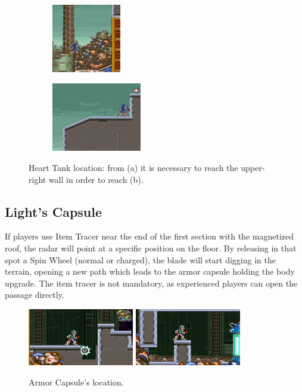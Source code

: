 \begin{figure}[htp]
	\centering
	\begin{subfigure}{0.3\linewidth}
		\centering
		\includegraphics[height=3cm]{figures/X2/Morph_moth/Moth_heart_1.jpg}	
		\caption{}
	\end{subfigure}
	\begin{subfigure}{0.4\linewidth}
		\centering
		\includegraphics[height=3cm]{figures/X2/Morph_moth/Moth_heart_2.jpg}
		\caption{}	
	\end{subfigure}
	\caption{Heart Tank location: from (a) it is necessary to reach the upper-right wall in order to reach (b).}
\end{figure}


\subsection{Light's Capsule}\label{X2:Body_parts}
If players use Item Tracer near the end of the first section with the magnetized roof, the radar will point at a specific position on the floor. By releasing in that spot a Spin Wheel (normal or charged), the blade will start digging in the terrain, opening a new path which leads to the armor capsule holding the body upgrade. The item tracer is not mandatory, as experienced players can open the passage directly.
\begin{figure}[htp]
	\centering
		\includegraphics[height=2.5cm]{figures/X2/Morph_moth/Moth_capsule_1.jpg}
		\includegraphics[height=2.5cm]{figures/X2/Morph_moth/Moth_capsule_2.jpg}
	\caption{Armor Capsule's location.}
\end{figure}

